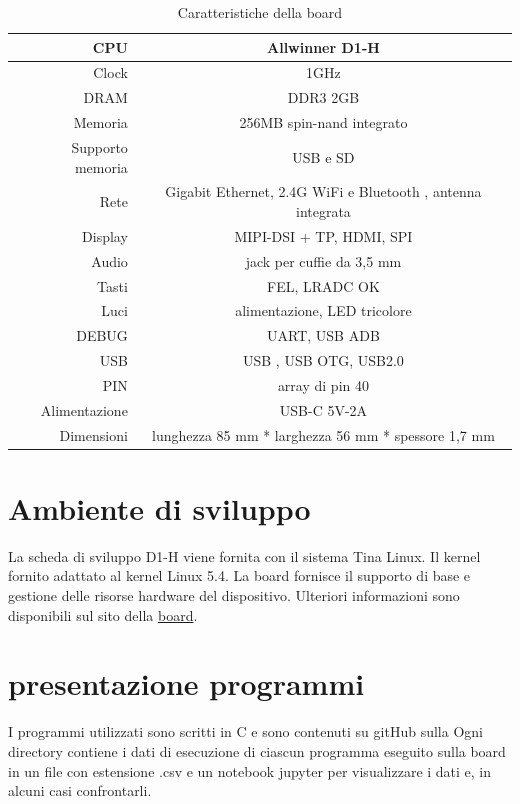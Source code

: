 \documentclass[12pt,a4paper]{report}
\begin{document}
\vspace{2cm}
\begin{table}[h!]
\centering
\begin{tabular}{|r|c|}
\hline
CPU & Allwinner D1-H \\
\hline
Clock & 1GHz\\
\hline
DRAM & DDR3 2GB\\
\hline
Memoria & 256MB  spin-nand integrato\\
\hline 
Supporto memoria & USB e  SD\\
\hline
Rete & Gigabit Ethernet,  2.4G WiFi e Bluetooth , antenna integrata\\
\hline
Display & MIPI-DSI + TP, HDMI, SPI \\
\hline
Audio & jack per cuffie da 3,5 mm\\
\hline
Tasti & FEL, LRADC OK\\
\hline
Luci &  alimentazione, LED tricolore\\
\hline
DEBUG & UART, USB ADB\\
\hline
USB & USB , USB OTG, USB2.0\\
\hline
PIN & array di pin 40\\
\hline
Alimentazione & USB-C  5V-2A\\
\hline
Dimensioni & lunghezza 85 mm * larghezza 56 mm * spessore 1,7 mm\\
\hline

\end{tabular}
\caption{Caratteristiche della board}
\end{table}

\section{Ambiente di sviluppo}
La scheda di sviluppo D1-H viene fornita con il sistema Tina Linux. Il kernel fornito  adattato al kernel Linux 5.4. La board fornisce il supporto di base e gestione delle risorse hardware del dispositivo. Ulteriori informazioni sono disponibili sul sito della \href{https://d1.docs.aw-ol.com/study/study_1tina/}{board}.

\section{presentazione programmi}
I programmi utilizzati sono scritti in C e sono contenuti su gitHub sulla 
 Ogni directory contiene i dati di esecuzione di ciascun programma eseguito sulla board in un file con estensione .csv e un notebook jupyter per visualizzare i dati e, in alcuni casi confrontarli.
\end{document}
